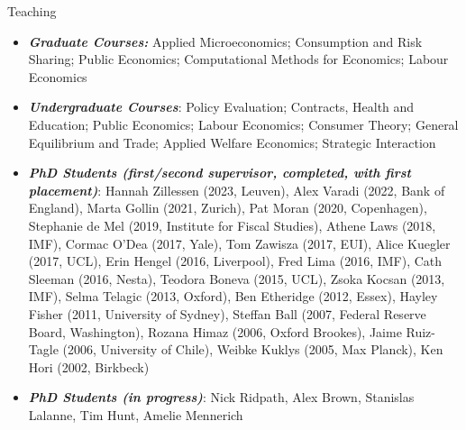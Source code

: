 \documentclass{resume} %
\begin{document}
\begin{rSection}{Teaching}
\begin{itemize}	
\item \textit{\textbf{Graduate Courses:}} Applied Microeconomics; Consumption and Risk Sharing; Public Economics; Computational Methods for Economics; Labour Economics
\item \textit{\textbf{Undergraduate Courses}}: Policy Evaluation; Contracts, Health and Education; Public Economics; Labour Economics; Consumer Theory; General Equilibrium and Trade; Applied Welfare Economics; Strategic Interaction

\item \textit{\textbf{PhD Students (first/second supervisor, completed, with first placement)}}: 
  Hannah Zillessen (2023, Leuven), Alex Varadi (2022, Bank of England), Marta Gollin (2021, Zurich), Pat Moran (2020, Copenhagen), Stephanie de Mel (2019, Institute for Fiscal Studies), Athene Laws (2018, IMF), Cormac O’Dea (2017, Yale),  Tom Zawisza (2017, EUI), Alice Kuegler (2017, UCL), Erin Hengel (2016, Liverpool), Fred Lima (2016, IMF), Cath Sleeman (2016, Nesta), Teodora Boneva (2015, UCL), Zsoka Kocsan (2013, IMF), Selma Telagic (2013, Oxford), Ben Etheridge (2012, Essex), Hayley Fisher (2011, University of Sydney), Steffan Ball (2007, Federal Reserve Board, Washington), Rozana Himaz (2006, Oxford Brookes), Jaime Ruiz-Tagle (2006, University of Chile), Weibke Kuklys (2005, Max Planck), Ken Hori (2002,  Birkbeck)
  \item \textit{\textbf{PhD Students (in progress)}}: Nick Ridpath, Alex Brown, Stanislas Lalanne, Tim Hunt, Amelie Mennerich
\end{itemize}
\end{rSection}
\end{document}
